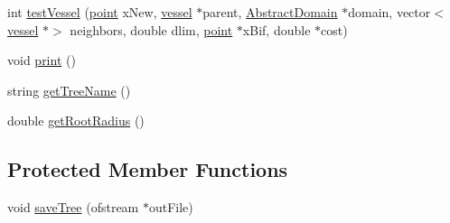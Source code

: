 \begin{DoxyCompactItemize}
\item 
int \mbox{\hyperlink{class_fixed_radius_root_c_c_o_tree_legacy_a1b36d4046bc3d3ac897eec5d1cec0308}{test\+Vessel}} (\mbox{\hyperlink{structpoint}{point}} x\+New, \mbox{\hyperlink{structvessel}{vessel}} $\ast$parent, \mbox{\hyperlink{class_abstract_domain}{Abstract\+Domain}} $\ast$domain, vector$<$ \mbox{\hyperlink{structvessel}{vessel}} $\ast$$>$ neighbors, double dlim, \mbox{\hyperlink{structpoint}{point}} $\ast$x\+Bif, double $\ast$cost)
\item 
void \mbox{\hyperlink{class_fixed_radius_root_c_c_o_tree_legacy_a0de200e3f10bdd9c2fc4e3c1f37334e1}{print}} ()
\item 
string \mbox{\hyperlink{class_fixed_radius_root_c_c_o_tree_legacy_af66ee29f27519813afaa18842d132520}{get\+Tree\+Name}} ()
\item 
double \mbox{\hyperlink{class_fixed_radius_root_c_c_o_tree_legacy_a4101d7bb1970dda44e58b788ccc58e5e}{get\+Root\+Radius}} ()
\end{DoxyCompactItemize}
\subsection*{Protected Member Functions}
\begin{DoxyCompactItemize}
\item 
void \mbox{\hyperlink{class_fixed_radius_root_c_c_o_tree_legacy_ae37ce4b6bd66712303927b7d67df3eb0}{save\+Tree}} (ofstream $\ast$out\+File)
\end{DoxyCompactItemize}

